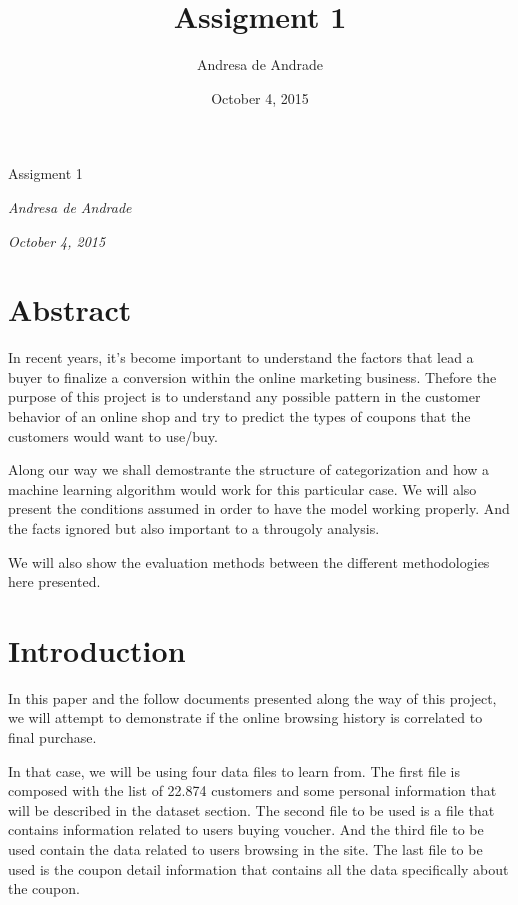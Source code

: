 \documentclass[]{article}
\title{Assigment 1}
\author{Andresa de Andrade}
\date{October 4, 2015}
\begin{document}
\begin{center}
\huge Assigment 1 \\[0.2cm]
\end{center}
\begin{center}
\large \emph{Andresa de Andrade}\\[0.1cm]
\end{center}
\begin{center}
\large \emph{October 4, 2015} \\
\end{center}
\normalsize


{
\hypersetup{linkcolor=black}
\setcounter{tocdepth}{2}
\tableofcontents
}
\section{Abstract}\label{abstract}

In recent years, it's become important to understand the factors that
lead a buyer to finalize a conversion within the online marketing
business. Thefore the purpose of this project is to understand any
possible pattern in the customer behavior of an online shop and try to
predict the types of coupons that the customers would want to use/buy.

Along our way we shall demostrante the structure of categorization and
how a machine learning algorithm would work for this particular case. We
will also present the conditions assumed in order to have the model
working properly. And the facts ignored but also important to a
througoly analysis.

We will also show the evaluation methods between the different
methodologies here presented.

\section{Introduction}\label{introduction}

In this paper and the follow documents presented along the way of this
project, we will attempt to demonstrate if the online browsing history
is correlated to final purchase.

In that case, we will be using four data files to learn from. The first
file is composed with the list of 22.874 customers and some personal
information that will be described in the dataset section. The second
file to be used is a file that contains information related to users
buying voucher. And the third file to be used contain the data related
to users browsing in the site. The last file to be used is the coupon
detail information that contains all the data specifically about the
coupon.
\end{document}
